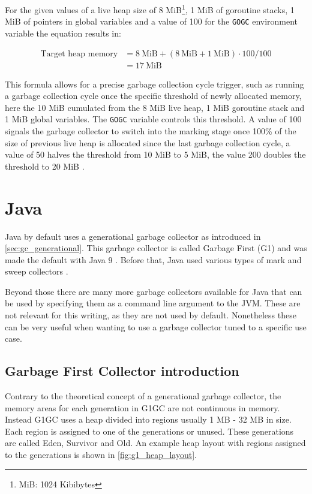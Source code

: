 For the given values of a live heap size of 8 MiB\footnote{MiB: 1024 Kibibytes}, 1 MiB of goroutine stacks,
1 MiB of pointers in global variables and a value of 100 for the \texttt{GOGC}
environment variable the equation results in:

\begin{align}
    \textrm{Target heap memory} &= 8 \ \textrm{MiB} + \left(8 \ \textrm{MiB} + 1 \ \textrm{MiB}\right) \cdot 100 / 100 \\
                                &= 17 \ \textrm{MiB}
\end{align}

This formula allows for a precise garbage collection cycle trigger, such as
running a garbage collection cycle once the specific threshold of newly
allocated memory, here the 10 MiB cumulated from the 8 MiB live heap, 1 MiB
goroutine stack and 1 MiB global variables. The \texttt{GOGC} variable controls
this threshold. A value of 100 signals the garbage collector to switch into the
marking stage once 100\% of the size of previous live heap is allocated since
the last garbage collection cycle, a value of 50 halves the threshold from 10
MiB to 5 MiB, the value 200 doubles the threshold to 20 MiB
\cite[GOGC]{go_gcguide_2022}.

\section{Java}

Java by default uses a generational garbage collector as introduced in
\autoref{sec:gc_generational}. This garbage collector is called Garbage First
(G1) and was made the default with Java 9 \cite{java_gc_comparison_2018}.
Before that, Java used various types of mark and sweep collectors
\cite{java_available_gcs}.

Beyond those there are many more garbage collectors available for Java that can
be used by specifying them as a command line argument to the JVM. These are not
relevant for this writing, as they are not used by default. Nonetheless these
can be very useful when wanting to use a garbage collector tuned to a specific
use case.

\subsection{Garbage First Collector introduction}

Contrary to the theoretical concept of a generational garbage collector,
the memory areas for each generation in G1GC are not continuous in memory.
Instead G1GC uses a heap divided into regions usually 1 MB - 32 MB in size.
Each region is assigned to one of the generations or unused.
These generations are called Eden, Survivor and Old. \cite{java_g1_getting_started}
An example heap layout with regions assigned to the generations is shown in \autoref{fig:g1_heap_layout}.

